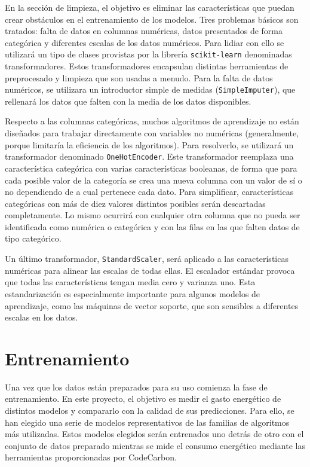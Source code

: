 En la sección de limpieza, el objetivo es eliminar las características que puedan crear obstáculos en el entrenamiento de los modelos. Tres problemas básicos son tratados: falta de datos en columnas numéricas, datos presentados de forma categórica y diferentes escalas de los datos numéricos. Para lidiar con ello se utilizará un tipo de clases provistas por la librería \texttt{scikit-learn} denominadas transformadores. Estos transformadores encapsulan distintas herramientas de preprocesado y limpieza que son usadas a menudo. Para la falta de datos numéricos, se utilizara un introductor simple de medidas (\texttt{SimpleImputer}), que rellenará los datos que falten con la media de los datos disponibles. 

Respecto a las columnas categóricas, muchos algoritmos de aprendizaje no están diseñados para trabajar directamente con variables no numéricas (generalmente, porque limitaría la eficiencia de los algoritmos). Para resolverlo, se utilizará un transformador denominado \texttt{OneHotEncoder}. Este transformador reemplaza una característica categórica con varias características booleanas, de forma que para cada posible valor de la categoría se crea una nueva columna con un valor de sí o no dependiendo de a cual pertenece cada dato. Para simplificar, características categóricas con más de diez valores distintos posibles serán descartadas completamente. Lo mismo ocurrirá con cualquier otra columna que no pueda ser identificada como numérica o categórica y con las filas en las que falten datos de tipo categórico.

Un último transformador, \texttt{StandardScaler}, será aplicado a las características numéricas para alinear las escalas de todas ellas. El escalador estándar provoca que todas las características tengan media cero y varianza uno. Esta estandarización es especialmente importante para algunos modelos de aprendizaje, como las máquinas de vector soporte, que son sensibles a diferentes escalas en los datos.



\section{Entrenamiento}

Una vez que los datos están preparados para su uso comienza la fase de entrenamiento. En este proyecto, el objetivo es medir el gasto energético de distintos modelos y compararlo con la calidad de sus predicciones. Para ello, se han elegido una serie de modelos representativos de las familias de algoritmos más utilizadas. Estos modelos elegidos serán entrenados uno detrás de otro con el conjunto de datos preparado mientras se mide el consumo energético mediante las herramientas proporcionadas por CodeCarbon.

